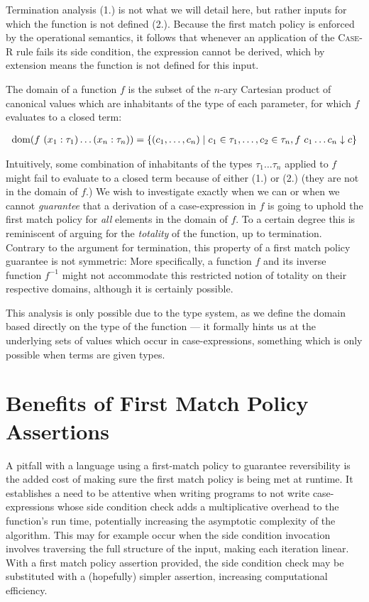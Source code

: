 Termination analysis (1.) is not what we will detail here, but rather inputs
for which the function is not defined (2.). Because the first match policy is
enforced by the operational semantics, it follows that whenever an application
of the \textsc{Case-R} rule fails its side condition, the expression cannot be
derived, which by extension means the function is not defined for this input.

\begin{definition}

The domain of a function $f$ is the subset of the $n$-ary Cartesian product of
canonical values which are inhabitants of the type of each parameter, for which
$f$ evaluates to a closed term:

\begin{align}
  \text{dom} (f~(x_1 : \tau_1) \dots (x_n : \tau_n)) =
  \{ (c_1, \dots, c_n) \mid c_1 \in \tau_1, \dots, c_2 \in \tau_n,
     f~c_1 \dots c_n \downarrow c \}
\end{align}

\end{definition}

Intuitively, some combination of inhabitants of the types $\tau_1 \dots \tau_n$
applied to $f$ might fail to evaluate to a closed term because of either (1.)
or (2.) (they are not in the domain of $f$.) We wish to investigate exactly
when we can or when we cannot \emph{guarantee} that a derivation of a
case-expression in $f$ is going to uphold the first match policy for \emph{all}
elements in the domain of $f$. To a certain degree this is reminiscent of
arguing for the \emph{totality} of the function, up to termination. Contrary to
the argument for termination, this property of a first match policy guarantee
is not symmetric: More specifically, a function $f$ and its inverse function
$f^{-1}$ might not accommodate this restricted notion of totality on their
respective domains, although it is certainly possible.

This analysis is only possible due to the type system, as we define the domain
based directly on the type of the function --- it formally hints us at the
underlying sets of values which occur in case-expressions, something which is
only possible when terms are given types.

\section{Benefits of First Match Policy Assertions}

A pitfall with a language using a first-match policy to guarantee reversibility
is the added cost of making sure the first match policy is being met at
runtime. It establishes a need to be attentive when writing programs to not
write case-expressions whose side condition check adds a multiplicative
overhead to the function's run time, potentially increasing the asymptotic
complexity of the algorithm. This may for example occur when the side condition
invocation involves traversing the full structure of the input, making each
iteration linear. With a first match policy assertion provided, the side
condition check may be substituted with a (hopefully) simpler assertion,
increasing computational efficiency.

